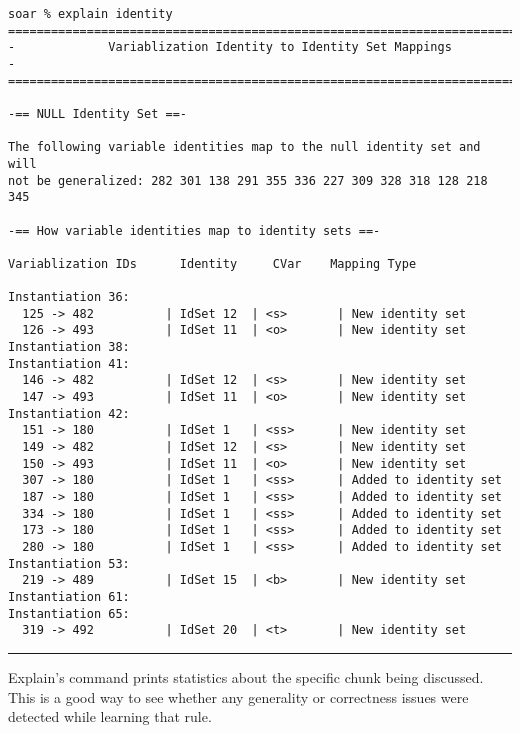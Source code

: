 {\scriptsize
\begin{verbatim}
soar % explain identity
=========================================================================
-             Variablization Identity to Identity Set Mappings          -
=========================================================================

-== NULL Identity Set ==-

The following variable identities map to the null identity set and will
not be generalized: 282 301 138 291 355 336 227 309 328 318 128 218 345

-== How variable identities map to identity sets ==-

Variablization IDs      Identity     CVar    Mapping Type

Instantiation 36:
  125 -> 482          | IdSet 12  | <s>       | New identity set
  126 -> 493          | IdSet 11  | <o>       | New identity set
Instantiation 38:
Instantiation 41:
  146 -> 482          | IdSet 12  | <s>       | New identity set
  147 -> 493          | IdSet 11  | <o>       | New identity set
Instantiation 42:
  151 -> 180          | IdSet 1   | <ss>      | New identity set
  149 -> 482          | IdSet 12  | <s>       | New identity set
  150 -> 493          | IdSet 11  | <o>       | New identity set
  307 -> 180          | IdSet 1   | <ss>      | Added to identity set
  187 -> 180          | IdSet 1   | <ss>      | Added to identity set
  334 -> 180          | IdSet 1   | <ss>      | Added to identity set
  173 -> 180          | IdSet 1   | <ss>      | Added to identity set
  280 -> 180          | IdSet 1   | <ss>      | Added to identity set
Instantiation 53:
  219 -> 489          | IdSet 15  | <b>       | New identity set
Instantiation 61:
Instantiation 65:
  319 -> 492          | IdSet 20  | <t>       | New identity set
\end{verbatim}
}

\rule{\textwidth}{1pt}

\textbf{}

Explain's  command prints statistics about the specific chunk being discussed.  This is a good way to see whether any generality or correctness issues were detected while learning that rule.

